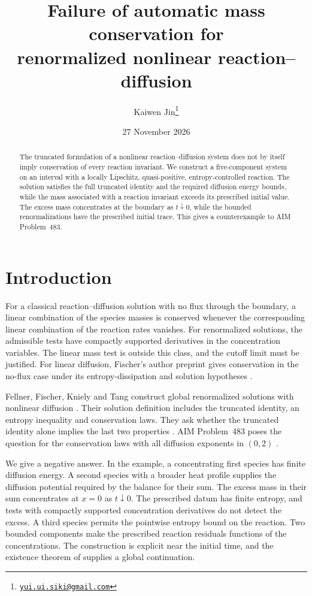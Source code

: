 \documentclass[11pt]{article}
\title{Failure of automatic mass conservation for\\
renormalized nonlinear reaction--diffusion}
\author{Kaiwen Jin\thanks{\href{mailto:yui.ui.siki@gmail.com}{\texttt{yui.ui.siki@gmail.com}}}}
\date{27 November 2026}
\begin{document}
\maketitle

\begin{abstract}
The truncated formulation of a nonlinear reaction--diffusion system does
not by itself imply conservation of every reaction invariant. We construct
a five-component system on an interval with a locally Lipschitz,
quasi-positive, entropy-controlled reaction. The solution satisfies the
full truncated identity and the required diffusion energy bounds, while
the mass associated with a reaction invariant exceeds its prescribed
initial value. The excess mass concentrates at the boundary as
\(t\downarrow0\), while the bounded renormalizations have the prescribed
initial trace. This
gives a counterexample to AIM Problem~483.
\end{abstract}

\section{Introduction}

For a classical reaction--diffusion solution with no flux through the
boundary, a linear combination of the species masses is conserved whenever
the corresponding linear combination of the reaction rates vanishes.
For renormalized solutions, the admissible tests have compactly supported
derivatives in the concentration variables. The linear mass test is outside
this class, and the cutoff limit must be justified. For linear diffusion,
Fischer's author preprint gives conservation in the no-flux case
under its entropy-dissipation and solution hypotheses
\cite[Proposition~6 in arXiv:1703.00730v1]{Fischer}.

Fellner, Fischer, Kniely and Tang construct global renormalized solutions
with nonlinear diffusion \cite[Theorem~1.3]{FFKT}. Their solution definition
includes the truncated identity, an entropy inequality and conservation
laws. They ask whether the truncated identity alone implies the last two
properties \cite[Remark~1.2]{FFKT}. AIM Problem~483 poses the question for
the conservation laws with all diffusion exponents in \((0,2)\)
\cite{AIM483}.

We give a negative answer. In the example, a concentrating first species
has finite diffusion energy. A second species with a broader heat profile
supplies the diffusion potential required by the balance for their sum.
The excess mass in their sum concentrates at \(x=0\) as \(t\downarrow0\).
The prescribed datum has finite entropy, and tests with compactly
supported concentration derivatives do not detect the excess.
A third species permits the pointwise entropy bound on the reaction. Two bounded components make
the prescribed reaction residuals functions of the concentrations.
The construction is explicit near the initial time, and the existence
theorem of \cite{FFKT} supplies a global continuation.
\end{document}
